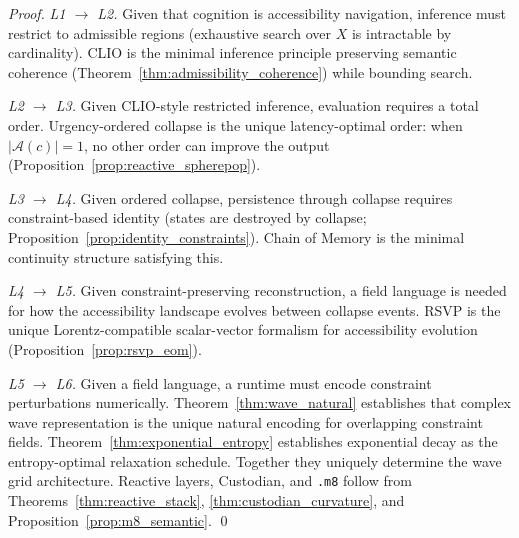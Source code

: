 \documentclass[12pt, a4paper, twoside]{article}
\theoremstyle{plain}
\theoremstyle{definition}
\theoremstyle{remark}
\newcommand{\Acc}{\mathcal{A}}
\begin{document}
\begin{proof}
\emph{L1 $\to$ L2.} Given that cognition is accessibility navigation, inference
must restrict to admissible regions (exhaustive search over $X$ is intractable
by cardinality). CLIO is the minimal inference principle preserving semantic
coherence (Theorem~\ref{thm:admissibility_coherence}) while bounding search.

\emph{L2 $\to$ L3.} Given CLIO-style restricted inference, evaluation requires
a total order. Urgency-ordered collapse is the unique latency-optimal order:
when $|\Acc(c)|=1$, no other order can improve the output
(Proposition~\ref{prop:reactive_spherepop}).

\emph{L3 $\to$ L4.} Given ordered collapse, persistence through collapse
requires constraint-based identity (states are destroyed by collapse;
Proposition~\ref{prop:identity_constraints}). Chain of Memory is the minimal
continuity structure satisfying this.

\emph{L4 $\to$ L5.} Given constraint-preserving reconstruction, a field
language is needed for how the accessibility landscape evolves between collapse
events. RSVP is the unique Lorentz-compatible scalar-vector formalism for
accessibility evolution (Proposition~\ref{prop:rsvp_eom}).

\emph{L5 $\to$ L6.} Given a field language, a runtime must encode constraint
perturbations numerically. Theorem~\ref{thm:wave_natural} establishes that
complex wave representation is the unique natural encoding for overlapping
constraint fields. Theorem~\ref{thm:exponential_entropy} establishes exponential
decay as the entropy-optimal relaxation schedule. Together they uniquely
determine the wave grid architecture. Reactive layers, Custodian, and
\texttt{.m8} follow from Theorems~\ref{thm:reactive_stack},
\ref{thm:custodian_curvature}, and Proposition~\ref{prop:m8_semantic}. \qed
\end{proof}
\end{document}
